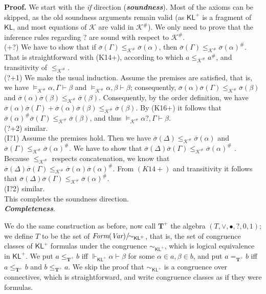 \documentclass{eptcs}
\newcommand{\proofbeg}{\textbf{Proof. }}
\newcommand{\KA}{\mathcal{K}}
\newcommand{\osigma}{\overline{\sigma}}
\newcommand{\KL}{\mathsf{KL}}
\begin{document}
\proofbeg
We start with the \textit{if} direction (\textbf{\textit{soundness}}). 
Most of the axioms can be skipped, as the old soundness arguments
remain valid (as $\KL^+$ is a fragment of
$\KL$, and most equations of $\KA$ are valid in $\KA^\#$). 
We only need to prove that the inference rules regarding
$?$ are sound with respect to $\KA^\#$.
\\

(+?) 
We have to show that if $\osigma(\Gamma)\leq_{\KA^\#} \osigma(\alpha)$, 
then $\osigma(\Gamma)\leq_{\KA^\#} \osigma(\alpha)^\#$.
That is straightforward with (K14+),  according to which $a\leq_{\KA^\#} a^\#$,
and transitivity of $\leq_{\KA^\#}$.
\\

(?+1) 
We make the usual induction. Assume the premises
are satisfied, that is, we have
$\models_{\KA^\#}\alpha,\Gamma\vdash\beta$ and
$\models_{\KA^\#}\alpha,\beta\vdash\beta$; consequently,
$\osigma(\alpha)\osigma(\Gamma)\leq_{\KA^\#} \osigma(\beta)$ 
and $\osigma(\alpha)\osigma(\beta)\leq_{\KA^\#} \osigma(\beta)$. 
Consequently, by the order definition,
we have $\osigma(\alpha)\osigma(\Gamma)+
\osigma(\alpha)\osigma(\beta)\leq_{\KA^\#} \osigma(\beta)$.  
By (K16+) it follows that 
$\osigma(\alpha)^\#\osigma(\Gamma)\leq_{\KA^\#} \osigma(\beta)$,
and thus
$\models_{\KA^\#}\alpha?,\Gamma\vdash\beta$.
\\

(?+2) 
similar.
\\

(I?1) 
Assume the premises hold. Then we have 
$\osigma(\Delta)\leq_{\KA^\#} \osigma(\alpha)$ and 
$\osigma(\Gamma)\leq_{\KA^\#} \osigma(\alpha)^\#$. We have to show that
$\osigma(\Delta)\osigma(\Gamma)\leq_{\KA^\#} \osigma(\alpha)^\#$ . 
Because $\leq_{\KA^\#}$ respects concatenation, we know that
$\osigma(\Delta)\osigma(\Gamma)\leq_{\KA^\#} \osigma(\alpha)\osigma(\alpha)^\#$. 
From $(K14+)$ and transitivity it follows that
$\osigma(\Delta)\osigma(\Gamma)\leq_{\KA^\#} \osigma(\alpha)^\#$.
\\

(I?2) 
similar.
\\

This completes the soundness direction. 
\\

\textbf{\textit{Completeness}}.

We do the same construction as before, now call $\textbf{T}^+$ the
algebra $(T,\vee,\bullet,?,0,1)$; we define $T$ to be 
the set of $\textit{Form}(\textit{Var})/\negmedspace\negmedspace\sim_{\KL^+}$, that is, the set
of congruence classes of $\KL^+$ formulas under the congruence
$\sim_{\KL^+}$, which is logical equivalence in $\KL^+$.
We put $a\leq_{\textbf{T}^+}b$ iff $\Vdash_{\KL^+}\alpha\vdash \beta$
for some $\alpha\in a,\beta\in b$, 
and put $a=_{\textbf{T}^+}b$ iff $a\leq_{\textbf{T}^+}b$ 
and $b\leq_{\textbf{T}^+}a$.
We skip the proof that $\sim_{\KL^+}$ is a congruence
over connectives, which is straightforward, and write 
congruence classes as if they were formulas.
\end{document}

